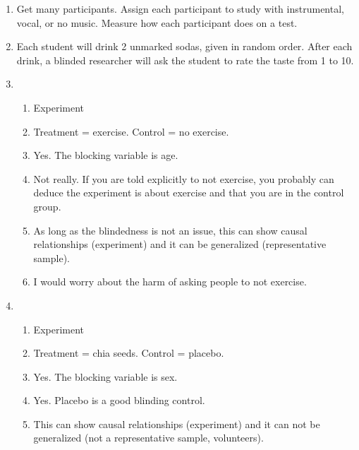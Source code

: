 \documentclass[12pt,letterpaper]{article}
\begin{document}
\begin{enumerate}
\item Get many participants. Assign each participant to study with instrumental, vocal, or no music. Measure how each participant does on a test.

\item Each student will drink 2 unmarked sodas, given in random order. After each drink, a blinded researcher will ask the student to rate the taste from 1 to 10.

\item \begin{enumerate}
\item Experiment
\item Treatment = exercise. Control = no exercise.
\item Yes. The blocking variable is age.
\item Not really. If you are told explicitly to not exercise, you probably can deduce the experiment is about exercise and that you are in the control group.
\item As long as the blindedness is not an issue, this can show causal relationships (experiment) and it can be generalized (representative sample).
\item I would worry about the harm of asking people to not exercise.
\end{enumerate}

\item \begin{enumerate}
\item Experiment
\item Treatment = chia seeds. Control = placebo.
\item Yes. The blocking variable is sex.
\item Yes. Placebo is a good blinding control. 
\item This can show causal relationships (experiment) and it can not be generalized (not a representative sample, volunteers).

\end{enumerate}

\end{enumerate}
\end{document}
